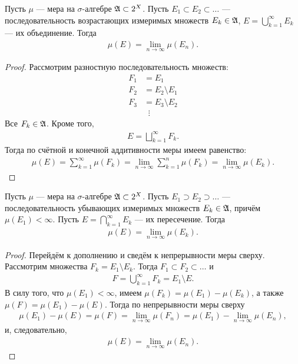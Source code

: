 \begin{claim}
 \label{claim:upward_continuity_of_measure}
 Пусть $\mu$ --- мера на $\sigma$-алгебре $\mathfrak{A} \subset 2^{X}$. Пусть  $E_1 \subset E_2 \subset \ldots$  --- последовательность возрастающих измеримых множеств $E_k \in \mathfrak{A}$, $E = \bigcup_{k=1}^{\infty} E_k$  --- их объединение. Тогда
 \begin{align*}
  \mu(E) = \lim_{n \to \infty} \mu(E_n) 
 .\end{align*} 
\end{claim}
\begin{proof}
 Рассмотрим разностную последовательность множеств:
 \begin{align*}
  F_1 &= E_1 \\
  F_2 &= E_2 \setminus E_1 \\
  F_3 &= E_3 \setminus E_2 \\
   &\;\;\vdots
 \end{align*} Все $F_k \in \mathfrak{A}$. Кроме того,
 \begin{align*}
  E = \bigsqcup_{k=1}^{\infty} F_k
 .\end{align*} Тогда по счётной и конечной аддитивности меры имеем равенство:
 \begin{align*}
  \mu(E) = \sum_{k=1}^{\infty} \mu(F_k) = \lim_{n \to \infty} \sum_{k=1}^{n} \mu(F_k) = \lim_{n \to \infty} \mu(E_k)  
 .\end{align*}
\end{proof}
\begin{claim}
 \label{claim:downward_continuity_of_measure}
 Пусть $\mu$ --- мера на $\sigma$-алгебре $\mathfrak{A} \subset 2^{X}$. Пусть $E_1 \supset E_2 \supset \ldots $ --- последовательность убывающих измеримых множеств $E_k \in \mathfrak{A}$, причём $\mu(E_1) < \infty$. Пусть $E = \bigcap_{k=1}^{\infty} E_k$  --- их пересечение. Тогда
 \begin{align*}
  \mu(E) = \lim_{n \to \infty} \mu(E_k) 
 .\end{align*} 
\end{claim}
\begin{proof}
 Перейдём к дополнению и сведём к непрерывности меры сверху. Рассмотрим множества $F_k = E_1 \setminus E_k$. Тогда $F_1 \subset F_2 \subset \ldots$ и 
 \begin{align*}
  F = \bigcup_{k=1}^{\infty} F_k = E_1 \setminus E
 .\end{align*} В силу того, что $\mu(E_1) < \infty$, имеем $\mu(F_k) = \mu(E_1) - \mu(E_k)$, а также $\mu(F) = \mu(E_1) - \mu(E)$. Тогда по непрерывности меры сверху
 \begin{align*}
  \mu(E_1) - \mu(E) = \mu(F) = \lim_{n \to \infty} \mu(F_n)  = \mu(E_1) - \lim_{n \to \infty} \mu(E_n) 
 ,\end{align*} и, следовательно,
 \begin{align*}
  \mu(E) = \lim_{n \to \infty} \mu(E_n) 
 .\end{align*} 
\end{proof}
